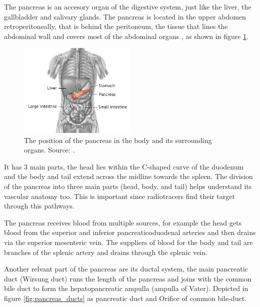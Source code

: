

The pancreas is an accesory organ of the digestive system, just like the liver, the gallbladder and salivary glands. The pancreas is located in the upper abdomen retroperitoneally, that is behind the peritoneum, the tissue that lines the abdominal wall and covers most of the abdominal organs \cite{talathi2023}, as shown in figure \ref{fig:pancreas_position}. 


\begin{figure}[H]
	\centering
	\includegraphics[width=0.5\textwidth]{assets/8883.png}
	\caption{The position of the pancreas in the body and its surrounding organs. Source: \cite{mountsinai_pancreatic_position}.}
	\label{fig:pancreas_position}
\end{figure}

It has 3 main parts, the head lies within the C-shaped curve of the duodenum and the body and tail extend across the midline towards the spleen. \cite{kenhub_pancreas} The division of the pancreas into three main parts (head, body, and tail) helps understand its vascular anatomy too. This is important since radiotracers find their target through this pathways. 

The pancreas receives blood from multiple sources, for example the head gets blood from the superior and inferior pancreaticoduodenal arteries and then drains via the superior mesenteric vein. The suppliers of blood for the body and tail are branches of the splenic artery and drains through the splenic vein. \cite{talathi2023,kenhub_pancreas}

Another relvant part of the pancreas are its ductal system, the main pancreatic duct (Wirsung duct) runs the length of the pancreas and joins with the common bile duct to form the hepatopancreatic ampulla (ampulla of Vater).\cite{kenhub_pancreas} Depicted in figure \ref{fig:pancreas_ducts} as pancreatic duct and Orifice of common bile-duct. 


